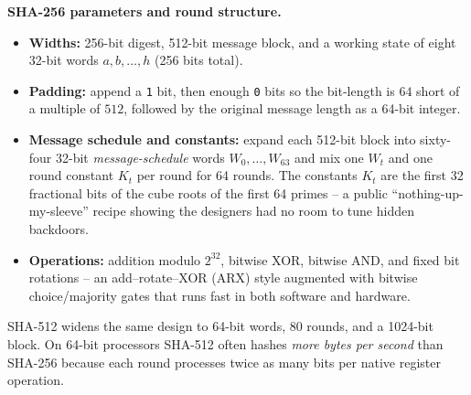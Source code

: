 \begin{focusbox}
\textbf{SHA-256 parameters and round structure.}
\begin{itemize}
  \item \textbf{Widths:} 256-bit digest, 512-bit message block, and a working state of eight 32-bit words $a, b, \dots, h$ (256 bits total).
  \item \textbf{Padding:} append a \texttt{1} bit, then enough \texttt{0} bits so the bit-length is $64$ short of a multiple of $512$, followed by the original message length as a 64-bit integer.
  \item \textbf{Message schedule and constants:} expand each 512-bit block into sixty-four 32-bit \emph{message-schedule} words $W_0, \dots, W_{63}$ and mix one $W_t$ and one round constant $K_t$ per round for 64 rounds. The constants $K_t$ are the first 32 fractional bits of the cube roots of the first 64 primes -- a public ``nothing-up-my-sleeve'' recipe showing the designers had no room to tune hidden backdoors.
  \item \textbf{Operations:} addition modulo $2^{32}$, bitwise XOR, bitwise AND, and fixed bit rotations -- an add--rotate--XOR (ARX) style augmented with bitwise choice/majority gates that runs fast in both software and hardware.
\end{itemize}
SHA-512 widens the same design to 64-bit words, 80 rounds, and a 1024-bit block. On 64-bit processors SHA-512 often hashes \emph{more bytes per second} than SHA-256 because each round processes twice as many bits per native register operation.
\end{focusbox}


